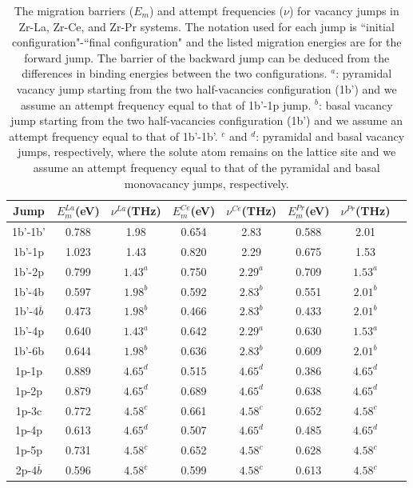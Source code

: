 \documentclass[preprint,12pt]{elsarticle}
\begin{document}
\begin{table}[h!]
    \centering
    \caption{The migration barriers ($E_m$) and attempt frequencies ($\nu$) for vacancy jumps in Zr-La, Zr-Ce, and Zr-Pr systems. The notation used for each jump is ``initial configuration"-``final configuration" and the listed migration energies are for the forward jump. The barrier of the backward jump can be deduced from the differences in binding energies between the two configurations.
    $^a$: pyramidal vacancy jump starting from the two half-vacancies configuration (1b') and we assume an attempt frequency equal to that of 1b'-1p jump. $^b$: basal vacancy jump starting from the two half-vacancies configuration (1b') and we assume an attempt frequency equal to that of 1b'-1b'. $^c$ and $^d$: pyramidal and basal vacancy jumps, respectively, where the solute atom remains on the lattice site and we assume an attempt frequency equal to that of the pyramidal and basal monovacancy jumps, respectively. }
    \begin{tabular}{c|c|c|c|c|c|c|c}
    \toprule
       Jump &$E_{m}^{La}$(eV) &$\nu^{La}$(THz) &$E_{m}^{Ce}$(eV) &$\nu^{Ce}$(THz)&$E_{m}^{Pr}$(eV) &$\nu^{Pr}$(THz)  \\
       \hline
       1b'-1b'  &0.788  &1.98 &0.654 &2.83 &0.588 &2.01 \\
       1b'-1p  &1.023  &1.43 &0.820 &2.29 &0.675 &1.53 \\
       1b'-2p  &0.799  &$1.43^{a}$ &0.750 &$2.29^{a}$ &0.709 &$1.53^{a}$ \\
       1b'-4b  &0.597  &$1.98^b$ &0.592 &$2.83^b$ &0.551 &$2.01^b$ \\
       1b'-4$\overline{b}$  &0.473  &$1.98^b$ &0.466 &$2.83^b$ &0.433 &$2.01^b$ \\
       1b'-4p  & 0.640 &$1.43^{a}$ &0.642 & $2.29^{a}$&0.630 &$1.53^{a}$\\
       1b'-6b  &0.644  &$1.98^b$ &0.636 &$2.83^b$ &0.609 &$2.01^b$ \\
       1p-1p  &0.889  &$4.65^d$ &0.515 &$4.65^d$ &0.386 &$4.65^d$ \\
       1p-2p  &0.879  &$4.65^d$ &0.689 &$4.65^d$ &0.638 &$4.65^d$ \\
       1p-3c  &0.772  &$4.58^c$ &0.661 &$4.58^c$ &0.652 &$4.58^c$ \\
       1p-4p  &0.613  &$4.65^d$ &0.507 &$4.65^d$ &0.485 &$4.65^d$ \\
       1p-5p  &0.731  &$4.58^c$ &0.652 &$4.58^c$ &0.628 &$4.58^c$ \\
       2p-4$\overline{b}$  &0.596  &$4.58^c$ &0.599 &$4.58^c$ &0.613 & $4.58^c$\\

\end{tabular}
\end{table}
\end{document}
